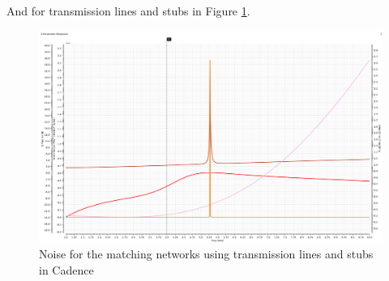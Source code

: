 And for transmission lines and stubs in Figure \ref{fig:NoiseLS}.

\begin{figure}[H]
    \centering
    \includegraphics*[scale = 0.3]{Images/noiseLS.png}
    \caption{Noise for the matching networks using transmission lines and stubs in Cadence}
    \label{fig:NoiseLS}
\end{figure}